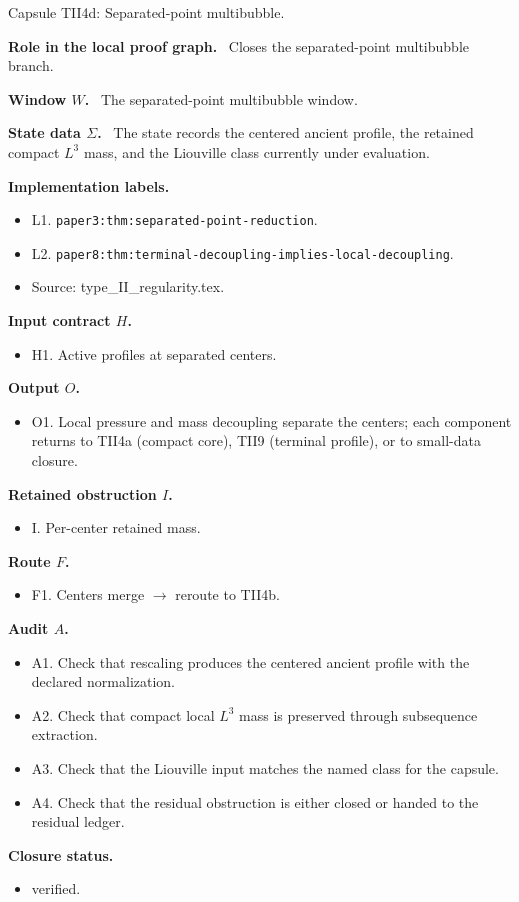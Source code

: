 \documentclass[11pt]{amsart}
\newcommand{\capsulefield}[1]{\par\smallskip\noindent\textbf{#1.}\ }
\begin{document}
\begin{proofcapsule}{Capsule TII4d: Separated-point multibubble.}
  \capsulefield{Role in the local proof graph}
  Closes the separated-point multibubble branch.

  \capsulefield{Window \(W\)}
The separated-point multibubble window.

  \capsulefield{State data \(\Sigma\)}
The state records the centered ancient profile, the retained compact $L^3$ mass, and the Liouville class currently under evaluation.

  \capsulefield{Implementation labels}
  \begin{itemize}[leftmargin=1.8em]
  \item L1. \texttt{paper3:thm:separated-point-reduction}.
  \item L2. \texttt{paper8:thm:terminal-decoupling-implies-local-decoupling}.
  \item Source: type\_II\_regularity.tex.
  \end{itemize}

  \capsulefield{Input contract \(H\)}
  \begin{itemize}[leftmargin=1.8em]
  \item H1. Active profiles at separated centers.
  \end{itemize}

  \capsulefield{Output \(O\)}
  \begin{itemize}[leftmargin=1.8em]
  \item O1. Local pressure and mass decoupling separate the centers; each component returns to TII4a (compact core), TII9 (terminal profile), or to small-data closure.
  \end{itemize}

  \capsulefield{Retained obstruction \(I\)}
  \begin{itemize}[leftmargin=1.8em]
  \item I. Per-center retained mass.
  \end{itemize}

  \capsulefield{Route \(F\)}
  \begin{itemize}[leftmargin=1.8em]
  \item F1. Centers merge $\to$ reroute to TII4b.
  \end{itemize}

  \capsulefield{Audit \(A\)}
  \begin{itemize}[leftmargin=1.8em]
  \item A1. Check that rescaling produces the centered ancient profile with the declared normalization.
  \item A2. Check that compact local $L^3$ mass is preserved through subsequence extraction.
  \item A3. Check that the Liouville input matches the named class for the capsule.
  \item A4. Check that the residual obstruction is either closed or handed to the residual ledger.
  \end{itemize}
  \capsulefield{Closure status}
  \begin{itemize}[leftmargin=1.8em]
  \item verified.
  \end{itemize}
\end{proofcapsule}
\end{document}
